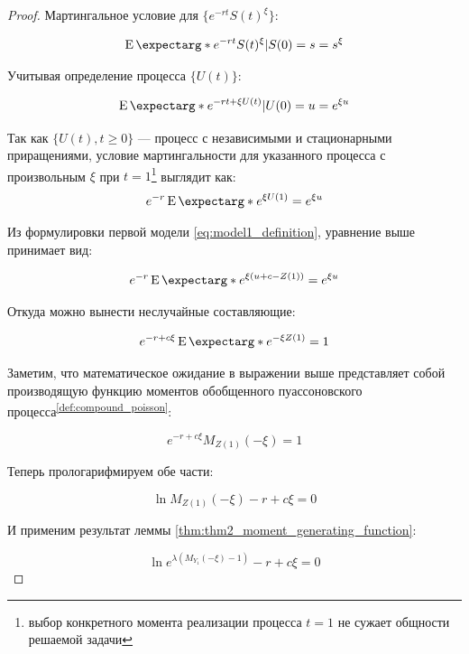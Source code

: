 \documentclass[a4paper,12pt]{article}
\theoremstyle{definition}
\newcommand{\expect}{\operatorname{E}\expectarg}
\begin{document}
\begin{proof}
Мартингальное условие для $\{e^{-rt} S(t)^{\xi}\}$:

\begin{equation*}
\expect*{e^{-rt} S(t)^{\xi}|S(0) = s} = s^{\xi}
\end{equation*}

Учитывая определение процесса $\{U(t)\}$:

\begin{equation*}
\expect*{e^{-rt + \xi U(t)}|U(0) = u} = e^{\xi u}
\end{equation*}

Так как $\{U(t), t \ge 0\}$ --- процесс с независимыми и стационарными приращениями, условие мартингальности для указанного процесса с произвольным $\xi$ при $t = 1$\footnote{выбор конкретного момента реализации процесса $t=1$ не сужает общности решаемой задачи} выглядит как:
\begin{equation*}\label{eq:thm2_eq1}
e^{-r}\expect*{e^{\xi U(1)}} = e^{\xi u}
\end{equation*}

Из формулировки первой модели \eqref{eq:model1_definition}, уравнение выше принимает вид:

\begin{equation*}
e^{-r}\expect*{e^{\xi(u + c - Z(1))}} = e^{\xi u}
\end{equation*}

Откуда можно вынести неслучайные составляющие:

\begin{equation*}
e^{-r + c \xi} \expect*{e^{-\xi Z(1)}} = 1
\end{equation*}

Заметим, что математическое ожидание в выражении выше представляет собой производящую функцию моментов обобщенного пуассоновского процесса\textsuperscript{{\ref{def:compound_poisson}}}:

\begin{equation*}
e^{-r + c \xi} M_{Z(1)}(-\xi) = 1
\end{equation*}

Теперь прологарифмируем обе части:

\begin{equation*}
\ln{M_{Z(1)}(- \xi)} - r + c\xi = 0
\end{equation*}

И применим результат леммы \ref{thm:thm2_moment_generating_function}:

\begin{equation*}
\ln{e^{\lambda (M_{Y_1}(- \xi) - 1)}} - r + c\xi = 0
\end{equation*}


\end{proof}
\end{document}
